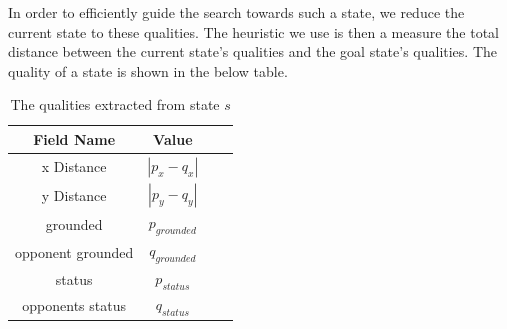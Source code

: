 In order to efficiently guide the search towards such a state, we reduce the current state to these qualities. The heuristic we use is then a measure the total distance between the current state's qualities and the goal state's qualities. The quality of a state is shown in the below table.

\begin{table}[h]
	\centering
	\caption{The qualities extracted from state $s$}
	\begin{tabular}{| c | c | c | c |}
		\hline
		Field Name & Value\\
		\hline
		x Distance        			& $|p_x - q_x|$ \\
		\hline            			
		y Distance        			& $|p_y - q_y|$ 	\\
		\hline
		grounded        			& $p_{grounded}$ \\
		\hline
		opponent grounded       	& $q_{grounded}$ \\
		\hline
		status       				& $p_{status}$ \\
		\hline
		opponents status        	& $q_{status}$ \\
		\hline
	\end{tabular}
	\label{qualities}
\end{table}




